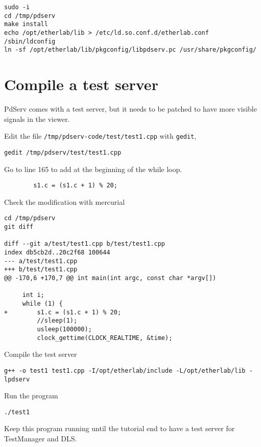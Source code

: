 \begin{verbatim}
sudo -i
cd /tmp/pdserv
make install
echo /opt/etherlab/lib > /etc/ld.so.conf.d/etherlab.conf
/sbin/ldconfig
ln -sf /opt/etherlab/lib/pkgconfig/libpdserv.pc /usr/share/pkgconfig/
\end{verbatim}


\section{Compile a test server}
\label{test-server-for-testmanager}
PdServ comes with a test server, but it needs to be patched
to have more visible signals in the viewer.

\noindent Edit the file \texttt{/tmp/pdserv-code/test/test1.cpp} with
\texttt{gedit},
\begin{verbatim}
gedit /tmp/pdserv/test/test1.cpp
\end{verbatim}

\noindent Go to line 165 to add at the beginning of the while loop.

\begin{verbatim}
        s1.c = (s1.c + 1) % 20;
\end{verbatim}

\noindent Check the modification with mercurial


\begin{verbatim}
cd /tmp/pdserv
git diff

diff --git a/test/test1.cpp b/test/test1.cpp
index db5cb2d..20c2f68 100644
--- a/test/test1.cpp
+++ b/test/test1.cpp
@@ -170,6 +170,7 @@ int main(int argc, const char *argv[])

     int i;
     while (1) {
+        s1.c = (s1.c + 1) % 20;
         //sleep(1);
         usleep(100000);
         clock_gettime(CLOCK_REALTIME, &time);
\end{verbatim}

\noindent Compile the test server

\begin{verbatim}
g++ -o test1 test1.cpp -I/opt/etherlab/include -L/opt/etherlab/lib -lpdserv
\end{verbatim}

\noindent Run the program
\begin{verbatim}
./test1
\end{verbatim}

\noindent Keep this program running until the tutorial end
to have a test server for TestManager and DLS.
